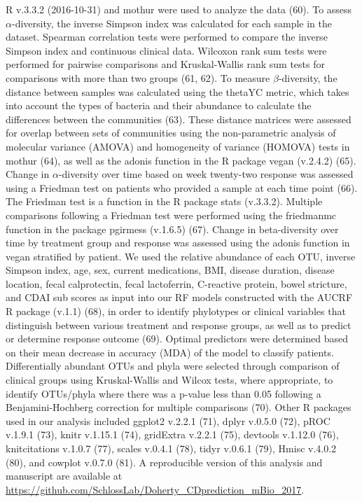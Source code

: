 \documentclass[12pt,]{article}
\begin{document}
R v.3.3.2 (2016-10-31) and mothur were used to analyze the data (60). To
assess \({\alpha}\)-diversity, the inverse Simpson index was calculated
for each sample in the dataset. Spearman correlation tests were
performed to compare the inverse Simpson index and continuous clinical
data. Wilcoxon rank sum tests were performed for pairwise comparisons
and Kruskal-Wallis rank sum tests for comparisons with more than two
groups (61, 62). To measure \({\beta}\)-diversity, the distance between
samples was calculated using the thetaYC metric, which takes into
account the types of bacteria and their abundance to calculate the
differences between the communities (63). These distance matrices were
assessed for overlap between sets of communities using the
non-parametric analysis of molecular variance (AMOVA) and homogeneity of
variance (HOMOVA) tests in mothur (64), as well as the adonis function
in the R package vegan (v.2.4.2) (65). Change in \({\alpha}\)-diversity
over time based on week twenty-two response was assessed using a
Friedman test on patients who provided a sample at each time point (66).
The Friedman test is a function in the R package stats (v.3.3.2).
Multiple comparisons following a Friedman test were performed using the
friedmanmc function in the package pgirmess (v.1.6.5) (67). Change in
beta-diversity over time by treatment group and response was assessed
using the adonis function in vegan stratified by patient. We used the
relative abundance of each OTU, inverse Simpson index, age, sex, current
medications, BMI, disease duration, disease location, fecal
calprotectin, fecal lactoferrin, C-reactive protein, bowel stricture,
and CDAI sub scores as input into our RF models constructed with the
AUCRF R package (v.1.1) (68), in order to identify phylotypes or
clinical variables that distinguish between various treatment and
response groups, as well as to predict or determine response outcome
(69). Optimal predictors were determined based on their mean decrease in
accuracy (MDA) of the model to classify patients. Differentially
abundant OTUs and phyla were selected through comparison of clinical
groups using Kruskal-Wallis and Wilcox tests, where appropriate, to
identify OTUs/phyla where there was a p-value less than 0.05 following a
Benjamini-Hochberg correction for multiple comparisons (70). Other R
packages used in our analysis included ggplot2 v.2.2.1 (71), dplyr
v.0.5.0 (72), pROC v.1.9.1 (73), knitr v.1.15.1 (74), gridExtra v.2.2.1
(75), devtools v.1.12.0 (76), knitcitations v.1.0.7 (77), scales v.0.4.1
(78), tidyr v.0.6.1 (79), Hmisc v.4.0.2 (80), and cowplot v.0.7.0 (81).
A reproducible version of this analysis and manuscript are available at
\url{https://github.com/SchlossLab/Doherty_CDprediction_mBio_2017}.
\end{document}
